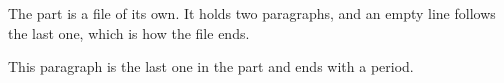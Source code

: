 The part is a file of its own. It holds two paragraphs, and an empty line follows the last one, which is how
the file ends.

This paragraph is the last one in the part and ends with a period.

